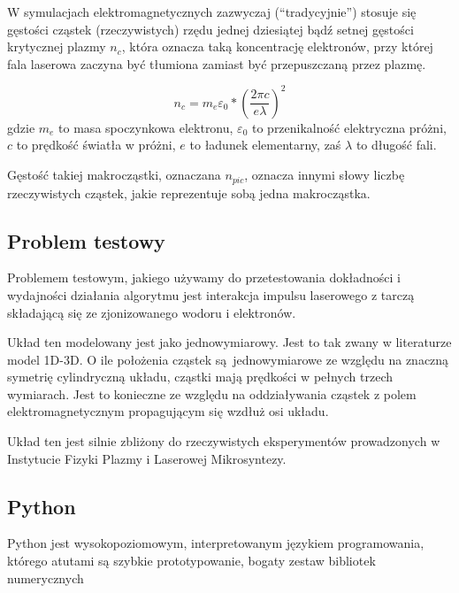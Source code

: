     W symulacjach elektromagnetycznych zazwyczaj (``tradycyjnie'') stosuje się
    gęstości cząstek (rzeczywistych) rzędu jednej dziesiątej bądź setnej
    gęstości krytycznej plazmy $n_c$, która oznacza taką koncentrację
    elektronów, przy której fala laserowa zaczyna być tłumiona zamiast być
    przepuszczaną przez plazmę.  

    \begin{equation}
        n_c = m_e \varepsilon_0 * {(\frac{2 \pi c}{e \lambda})}^2
        \label{eqn:critical-density}
    \end{equation}
    gdzie $m_e$ to masa spoczynkowa elektronu, $\varepsilon_0$ to przenikalność
    elektryczna próżni, $c$ to prędkość światła w
    próżni, $e$ to ładunek elementarny, zaś $\lambda$ to długość fali.

    Gęstość takiej makrocząstki, oznaczana $n_{pic}$, oznacza innymi słowy
    liczbę rzeczywistych cząstek, jakie reprezentuje sobą jedna makrocząstka.

    \subsection{Problem testowy}

    Problemem testowym, jakiego używamy do przetestowania dokładności i
    wydajności działania algorytmu jest interakcja impulsu laserowego z tarczą
    składającą się ze zjonizowanego wodoru i elektronów.

    Układ ten modelowany jest jako jednowymiarowy. Jest to tak zwany w
    literaturze model 1D-3D.  O ile położenia cząstek są jednowymiarowe ze
    względu na znaczną symetrię cylindryczną układu, cząstki mają prędkości w
    pełnych trzech wymiarach. Jest to konieczne ze względu na oddziaływania
    cząstek z polem elektromagnetycznym propagującym się wzdłuż osi układu.

    Układ ten jest silnie zbliżony do rzeczywistych eksperymentów prowadzonych
    w Instytucie Fizyki Plazmy i Laserowej Mikrosyntezy.  

    \subsection{Python}
    Python jest wysokopoziomowym, interpretowanym językiem programowania,
    którego atutami są szybkie prototypowanie, bogaty zestaw bibliotek
    numerycznych

